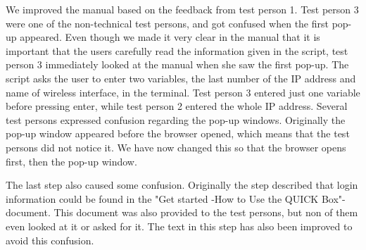 We improved the manual based on the feedback from test person 1. Test person 3 were one of the non-technical test persons, and got confused when the first pop-up appeared. Even though we made it very clear in the manual that it is important that the users carefully read the information given in the script, test person 3 immediately looked at the manual when she saw the first pop-up. The script asks the user to enter two variables, the last number of the IP address and name of wireless interface, in the terminal. Test person 3 entered just one variable before pressing enter, while test person 2 entered the whole IP address. 
Several test persons expressed confusion regarding the pop-up windows. Originally the pop-up window appeared before the browser opened, which means that the test persons did not notice it. We have now changed this so that the browser opens first, then the pop-up window. 

The last step also caused some confusion. Originally the step described that login information could be found in the "Get started -How to Use the QUICK Box"-document. This document was also provided to the test persons, but non of them even looked at it or asked for it. The text in this step has also been improved to avoid this confusion.